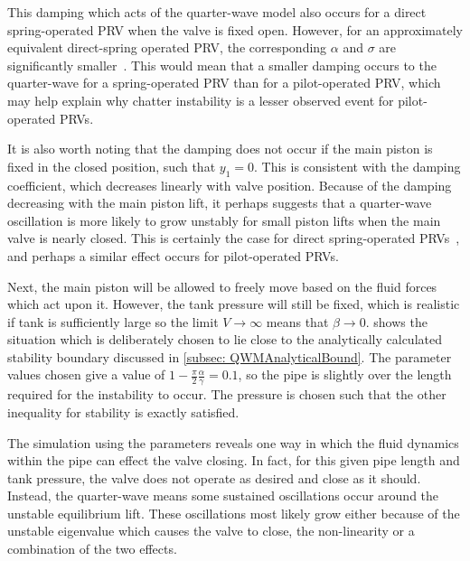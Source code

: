 This damping which acts of the quarter-wave model also occurs for a direct spring-operated PRV when the valve is fixed open. However, for an approximately equivalent direct-spring operated PRV, the corresponding $\alpha$ and $\sigma$ are significantly smaller~\cite{Hos2015DynamicModelling}. This would mean that a smaller damping occurs to the quarter-wave for a spring-operated PRV than for a pilot-operated PRV, which may help explain why chatter instability is a lesser observed event for pilot-operated PRVs.

It is also worth noting that the damping does not occur if the main piston is fixed in the closed position, such that $y_1 = 0$. This is consistent with the damping coefficient, which decreases linearly with valve position. Because of the damping decreasing with the main piston lift, it perhaps suggests that a quarter-wave oscillation is more likely to grow unstably for small piston lifts when the main valve is nearly closed. This is certainly the case for direct spring-operated PRVs~\cite{Hos2017DynamicRecommendations}, and perhaps a similar effect occurs for pilot-operated PRVs.


Next, the main piston will be allowed to freely move based on the fluid forces which act upon it. However, the tank pressure will still be fixed, which is realistic if tank is sufficiently large so the limit $V \rightarrow \infty$ means that $\beta \rightarrow 0$.  shows the situation which is deliberately chosen to lie close to the analytically calculated stability boundary discussed in \cref{subsec: QWMAnalyticalBound}. The parameter values chosen give a value of $1 - \frac{\pi}{2} \frac{\alpha}{\gamma} = 0.1$, so the pipe is slightly over the length required for the instability to occur. The pressure is chosen such that the other inequality for stability is exactly satisfied.
~


The simulation using the parameters reveals one way in which the fluid dynamics within the pipe can effect the valve closing. In fact, for this given pipe length and tank pressure, the valve does not operate as desired and close as it should. Instead, the quarter-wave means some sustained oscillations occur around the unstable equilibrium lift. These oscillations most likely grow either because of the unstable eigenvalue which causes the valve to close, the non-linearity or a combination of the two effects.

